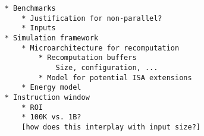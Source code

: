 \begin{verbatim}
    * Benchmarks 
        * Justification for non-parallel?
        * Inputs
    * Simulation framework 
        * Microarchitecture for recomputation
            * Recomputation buffers
                Size, configuration, ...
            * Model for potential ISA extensions
        * Energy model
    * Instruction window 
        * ROI
        * 100K vs. 1B? 
        [how does this interplay with input size?]
\end{verbatim}
